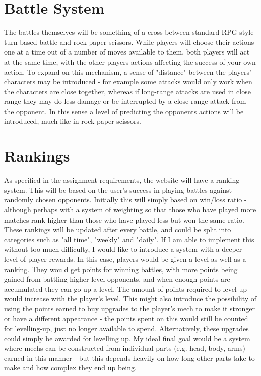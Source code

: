 \documentclass{article}
\begin{document}
\section{Battle System}
The battles themselves will be something of a cross between standard RPG-style turn-based battle and rock-paper-scissors. While players will choose their actions one at a time out of a number of moves available to them, both players will act at the same time, with the other players actions affecting the success of your own action.
To expand on this mechanism, a sense of "distance" between the players' characters may be introduced - for example some attacks would only work when the characters are close together, whereas if long-range attacks are used in close range they may do less damage or be interrupted by a close-range attack from the opponent. In this sense a level of predicting the opponents actions will be introduced, much like in rock-paper-scissors.

\section{Rankings} 
As specified in the assignment requirements, the website will have a ranking system. This will be based on the user's success in playing battles against randomly chosen opponents. Initially this will simply based on win/loss ratio - although perhaps with a system of weighting so that those who have played more matches rank higher than those who have played less but won the same ratio.
These rankings will be updated after every battle, and could be split into categories such as "all time", "weekly" and "daily".
If I am able to implement this without too much difficulty, I would like to introduce a system with a deeper level of player rewards. In this case, players would be given a level as well as a ranking. They would get points for winning battles, with more points being gained from battling higher level opponents, and when enough points are accumulated they can go up a level. The amount of points required to level up would increase with the player's level. This might also introduce the possibility of using the points earned to buy upgrades to the player's mech to make it stronger or have a different appearance - the points spent on this would still be counted for levelling-up, just no longer available to spend. Alternatively, these upgrades could simply be awarded for levelling up. My ideal final goal would be a system where mechs can be constructed from individual parts (e.g. head, body, arms) earned in this manner - but this depends heavily on how long other parts take to make and how complex they end up being.
\end{document}
